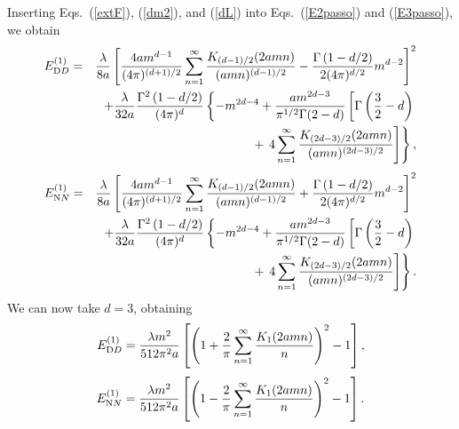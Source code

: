 \documentclass[a4paper,dvips,12pt]{article}
\begin{document}
Inserting Eqs.\ (\ref{extF}), (\ref{dm2}), and (\ref{dL}) 
into Eqs.\ (\ref{E2passo}) and (\ref{E3passo}), we obtain
\begin {eqnarray}
\label {E1dDD}
E_{\textrm DD}^{(1)}&=&{\lambda\over 8a}\left[{4am^{d-1}\over(4\pi)^{(d+1)/2}}
\sum_{n=1}^{\infty}{K_{(d-1)/2}(2amn)\over(amn)^{(d-1)/2}}
-{\Gamma\left(1-d/2\right)\over 2(4\pi)^{d/2}}m^{d-2}\right]^{2}
\nonumber \\
& &+{\lambda\over 32a}{\Gamma^{2}\left(1-d/2\right)\over(4\pi)^{d}}
\left\{-m^{2d-4}+{am^{2d-3}\over\pi^{1/2}\Gamma(2-d)}\left[
\Gamma\left(\frac{3}{2}-d\right)\right. \right.
\nonumber \\
& &+\left. \left. 4\sum_{n=1}^{\infty}
{K_{(2d-3)/2}(2amn)\over(amn)^{(2d-3)/2}}\right]\right\},
\end {eqnarray}
\begin {eqnarray}
\label {E1dNN}
E_{\textrm NN}^{(1)}&=&{\lambda\over 8a}\left[{4am^{d-1}\over(4\pi)^{(d+1)/2}}
\sum_{n=1}^{\infty}{K_{(d-1)/2}(2amn)\over(amn)^{(d-1)/2}}
+{\Gamma\left(1-d/2\right)\over 2(4\pi)^{d/2}}m^{d-2}\right]^{2}
\nonumber \\
& &+{\lambda\over 32a}{\Gamma^{2}\left(1-d/2\right)\over(4\pi)^{d}}
\left\{-m^{2d-4}+{am^{2d-3}\over\pi^{1/2}\Gamma(2-d)}\left[
\Gamma\left(\frac{3}{2}-d\right)\right. \right.
\nonumber \\
& &+ \left. \left. 4\sum_{n=1}^{\infty}
{K_{(2d-3)/2}(2amn)\over(amn)^{(2d-3)/2}}\right]\right\}.
\end {eqnarray}
We can now take $d=3$, obtaining
\begin {equation}
\label {E1d=3DD}
E_{\textrm DD}^{(1)}={\lambda m^{2}\over 512 \pi^{2}a}\left[\left(1+{2\over\pi}
\sum_{n=1}^{\infty}{K_{1}(2amn)\over n}\right)^{2}-1\right],
\end {equation}
\begin {equation}
\label {E1d=3NN}
E_{\textrm NN}^{(1)}={\lambda m^{2}\over 512 \pi^{2}a}
\left[\left(1-{2\over\pi}\sum_{n=1}^{\infty}{K_{1}(2amn)\over n}\right)^{2}-1\right].
\end {equation}
\end{document}
